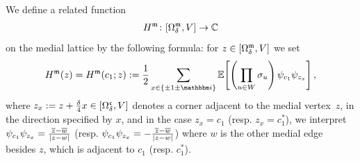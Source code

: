 \documentclass[12pt,oneside,english]{amsart}
\numberwithin{equation}{section}
\numberwithin{figure}{section}
\theoremstyle{plain}
\theoremstyle{plain}
\theoremstyle{plain}
\theoremstyle{plain}
\theoremstyle{remark}
\theoremstyle{definition}
\theoremstyle{plain}
\theoremstyle{plain}
\numberwithin{thm}{section}
\begin{document}
We define a related function
\begin{align*}
H^{\mathfrak{m}} \colon {\left[ {{\Omega}}_{{\delta}}^{\mathfrak{m}}, V \right]} \to  \mathbb{C}
\end{align*}
on the medial lattice by the following formula: for
$z \in {\left[ {{\Omega}}_{{\delta}}^{\mathfrak{m}}, V \right]}$ we set
\begin{align}\label{eq: def of H on medial lattice}
H^\mdl(z) = H^\mdl ( c_{1} ; z )
:= \frac{1}{2} \sum_{x\in\set{ \pm 1 \pm \ii } }
  \correl{ \left(\prod_{u \in W}\spin_{u}\right)
    \ferm_{c_{1}} \ferm_{z_{x}} } ,
\end{align}
where $z_{x} := z + \frac{{\delta}}{4} x \in {\left[ {{\Omega}}_{{\delta}}^{\mathfrak{c}}, V \right]}$
denotes a corner adjacent to the medial vertex~$z$, in the direction 
specified by $x$, and in the case $z_{x}=c_{1}$ (resp. 
$z_{x}=c_{1}^*$),
we interpret
${\psi}_{c_{1}} {\psi}_{z_{x}} = \frac{\overline{z}-\overline{w}}{\left|z-w\right|}$
(resp.
${\psi}_{c_{1}} {\psi}_{z_{x}} = -\frac{\overline{z}-\overline{w}}{\left|z-w\right|}$)
where $w$ is the other medial edge besides $z$, which is adjacent to
$c_{1}$ (resp. $c_{1}^*$).
\end{document}
